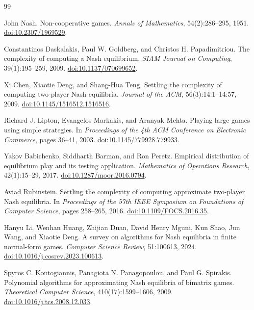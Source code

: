 \documentclass[11pt]{article}
\theoremstyle{remark}
\theoremstyle{plain}
\begin{document}
\begin{thebibliography}{99}

John Nash.
\newblock Non-cooperative games.
\newblock \emph{Annals of Mathematics}, 54(2):286--295, 1951.
\newblock \href{https://doi.org/10.2307/1969529}{doi:10.2307/1969529}.

Constantinos Daskalakis, Paul W. Goldberg, and Christos H. Papadimitriou.
\newblock The complexity of computing a Nash equilibrium.
\newblock \emph{SIAM Journal on Computing}, 39(1):195--259, 2009.
\newblock \href{https://doi.org/10.1137/070699652}{doi:10.1137/070699652}.

Xi Chen, Xiaotie Deng, and Shang-Hua Teng.
\newblock Settling the complexity of computing two-player Nash equilibria.
\newblock \emph{Journal of the ACM}, 56(3):14:1--14:57, 2009.
\newblock \href{https://doi.org/10.1145/1516512.1516516}{doi:10.1145/1516512.1516516}.

Richard J. Lipton, Evangelos Markakis, and Aranyak Mehta.
\newblock Playing large games using simple strategies.
\newblock In \emph{Proceedings of the 4th ACM Conference on Electronic
Commerce}, pages 36--41, 2003.
\newblock \href{https://doi.org/10.1145/779928.779933}{doi:10.1145/779928.779933}.

Yakov Babichenko, Siddharth Barman, and Ron Peretz.
\newblock Empirical distribution of equilibrium play and its testing application.
\newblock \emph{Mathematics of Operations Research}, 42(1):15--29, 2017.
\newblock \href{https://doi.org/10.1287/moor.2016.0794}{doi:10.1287/moor.2016.0794}.

Aviad Rubinstein.
\newblock Settling the complexity of computing approximate two-player Nash
equilibria.
\newblock In \emph{Proceedings of the 57th IEEE Symposium on Foundations of
Computer Science}, pages 258--265, 2016.
\newblock \href{https://doi.org/10.1109/FOCS.2016.35}{doi:10.1109/FOCS.2016.35}.

Hanyu Li, Wenhan Huang, Zhijian Duan, David Henry Mguni, Kun Shao, Jun Wang,
and Xiaotie Deng.
\newblock A survey on algorithms for Nash equilibria in finite normal-form games.
\newblock \emph{Computer Science Review}, 51:100613, 2024.
\newblock \href{https://doi.org/10.1016/j.cosrev.2023.100613}{doi:10.1016/j.cosrev.2023.100613}.

Spyros C. Kontogiannis, Panagiota N. Panagopoulou, and Paul G. Spirakis.
\newblock Polynomial algorithms for approximating Nash equilibria of
bimatrix games.
\newblock \emph{Theoretical Computer Science}, 410(17):1599--1606, 2009.
\newblock \href{https://doi.org/10.1016/j.tcs.2008.12.033}{doi:10.1016/j.tcs.2008.12.033}.


\end{thebibliography}
\end{document}
